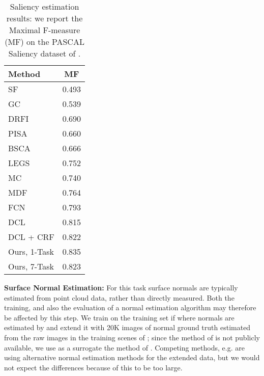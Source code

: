 \documentclass[10pt,twocolumn,letterpaper]{article}
\begin{document}
 \begin{table}[!h]
 		\begin{tabular}{|l |c|}		
 			\hline	
 		Method	&  MF \\ \hline\hline
 	SF \cite{PerazziKPH12} & 	0.493\\\hline
GC \cite{msra} & 0.539\\\hline
DRFI \cite{JiangLYP13} & 0.690\\\hline
PISA \cite{WangLLLS15}& 0.660\\\hline
BSCA \cite{QinLXW15} & 0.666\\\hline
			LEGS \cite{WangLRY15} & 0.752 \\\hline
			MC  \cite{ZhaoOLW15} & 0.740 \\\hline
			MDF  \cite{LiY15} & 0.764\\\hline
			FCN  \cite{saliencycvpr16} & 0.793 \\
 			DCL   \cite{saliencycvpr16} & 0.815 \\
 			DCL + CRF \cite{saliencycvpr16} & 0.822 \\\hline
 			Ours, 1-Task & 0.835 \\
 			Ours, 7-Task & 0.823 \\\hline
 		\end{tabular}
 	\caption{Saliency estimation results: we report the Maximal F-measure (MF)  on the PASCAL Saliency dataset of \cite{LiHKRY14}.\label{table:results_e}}
 \end{table}
 
 
 \textbf{Surface Normal Estimation:} For this task surface normals are typically estimated from point cloud data, rather than directly measured. Both the training, and also the evaluation of a normal estimation algorithm may therefore be affected by this step.  
 We train on the training set if \cite{nyu} where normals are estimated by   \cite{LadickyZP14} and extend it with 20K images of normal ground truth estimated from the raw images in the training scenes of \cite{nyu}; since the method of \cite{LadickyZP14} is not publicly available, we use as a surrogate the method of \cite{Ren12}. Competing methods, e.g. \cite{Eigen15,BansalRG16} are using alternative normal estimation methods for the extended data, but we would not expect the differences because of this to be too large. 
 
\end{document}
